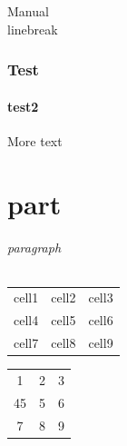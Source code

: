 \documentclass[12pt]{article}
\begin{document}
Manual \\ linebreak

\section{Test}
\subsection{test2}
More text

\part{part}
\paragraph{paragraph}


\begin{center}
\begin{tabular}{c c c}
    cell1 & cell2 & cell3 \\ 
    cell4 & cell5 & cell6 \\  
    cell7 & cell8 & cell9    
\end{tabular}
\end{center}

\begin{center}
\begin{tabular}{|c|c|c|} 
    \hline
    1 & 2 & 3 \\ 
    45 & 5 & 6 \\ 
    7 & 8 & 9 \\ 
    \hline
\end{tabular}
\end{center}
\end{document}
